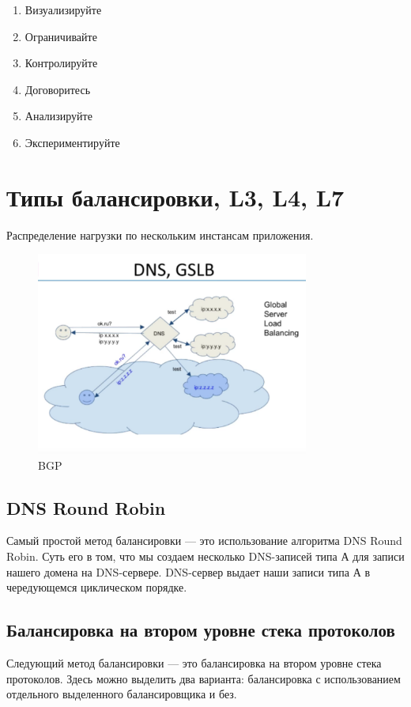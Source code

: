 \begin{enumerate}
\item Визуализируйте
\item Ограничивайте
\item Контролируйте
\item Договоритесь
\item Анализируйте
\item Экспериментируйте
\end{enumerate}


 \section{Типы балансировки, L3, L4, L7}
Распределение нагрузки по нескольким инстансам приложения.

\begin{figure}[h!]
\centering
\includegraphics[width=0.8\textwidth]{balansing}
\caption{BGP}
\label{balansing}
\end{figure}
 
 \subsection{DNS Round Robin}
 Самый простой метод балансировки — это использование алгоритма DNS Round Robin. Суть его в том, что мы создаем несколько DNS-записей типа А для записи нашего домена на DNS-сервере. DNS-сервер выдает наши записи типа А в чередующемся циклическом порядке.
 
\subsection{Балансировка на втором уровне стека протоколов}     
 Следующий метод балансировки — это балансировка на втором уровне стека протоколов. Здесь можно выделить два варианта: балансировка с использованием отдельного выделенного балансировщика и без.

